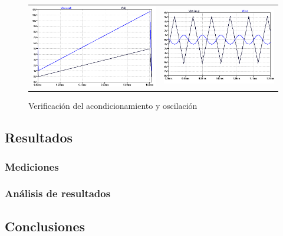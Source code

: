 \begin{figure}[H]
    \centering
    \begin{tabular}{c c}
        \includegraphics[scale=0.35]{../EJ3/Recursos/verificacion_acondicionamiento.png} &
        \includegraphics[scale=0.4]{../EJ3/Recursos/verificacion_vco.png}
    \end{tabular}
    \caption{Verificaci\'on del acondicionamiento y oscilaci\'on}
    \label{fig:verificacion}
\end{figure}

\subsection{Resultados}

\subsubsection{Mediciones}

\subsubsection{An\'alisis de resultados}

\subsection{Conclusiones}